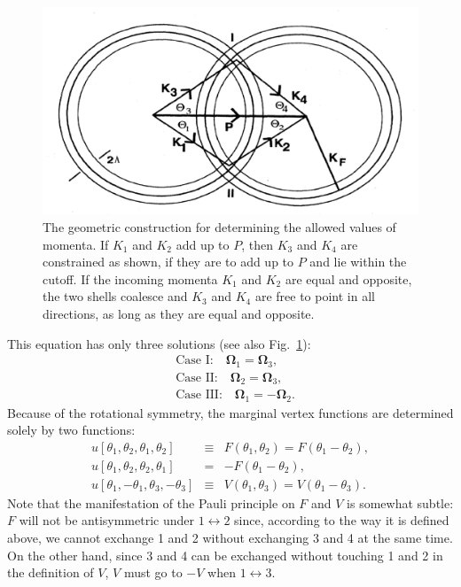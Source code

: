 \begin{figure}[]
	\centering
	\includegraphics[width=0.5\linewidth]{pics/FL-kcons.png}
	\caption{The geometric construction for determining the allowed values of momenta. If $K_{1}$ and $K_{2}$ add up to $P$, then $K_{3}$ and $K_{4}$ are constrained as shown, if they are to add up to $P$ and lie within the cutoff. If the incoming momenta $K_{1}$ and $K_{2}$ are equal and opposite, the two shells coalesce and $K_{3}$ and $K_{4}$ are free to point in all directions, as long as they are equal and opposite.}
	\label{fig:FL-kcons}
\end{figure}

This equation has only three solutions (see also Fig.~\ref{fig:FL-kcons}):
\begin{equation}
\begin{aligned}
	&\text{Case I:} \quad \bm \Omega_1 = \bm \Omega_3, \\
	&\text{Case II:} \quad \bm \Omega_2 = \bm \Omega_3, \\
	&\text{Case III:} \quad \bm \Omega_1 = -\bm \Omega_2.
\end{aligned}
\end{equation}
Because of the rotational symmetry, the marginal vertex functions are determined solely by two functions:
\begin{eqnarray}
	u[\theta_1,\theta_2,\theta_1,\theta_2] &\equiv& F(\theta_1,\theta_2) = F(\theta_1-\theta_2), \\
	u[\theta_1,\theta_2,\theta_2,\theta_1] &=& -F(\theta_1-\theta_2), \\
	u[\theta_1,-\theta_1,\theta_3,-\theta_3] &\equiv& V(\theta_1,\theta_3) = V(\theta_1-\theta_3).
\end{eqnarray}
Note that the manifestation of the Pauli principle on $F$ and $V$ is somewhat subtle: $F$ will not be antisymmetric under $1 \leftrightarrow 2$ since, according to the way it is defined above, we cannot exchange 1 and 2 without exchanging 3 and 4 at the same time. 
On the other hand, since 3 and 4 can be exchanged without touching 1 and 2 in the definition of $V$, $V$ must go to $-V$ when $1 \leftrightarrow 3$.

